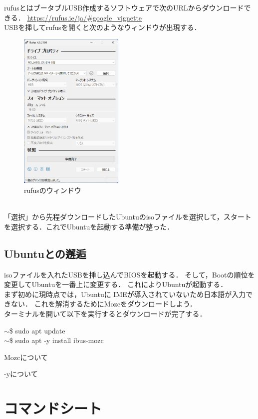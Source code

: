 \documentclass[dvipdfmx,a4paper,11pt]{jsbook}
\begin{document}
rufusとはブータブルUSB作成するソフトウェアで次のURLからダウンロードできる．
\url{https://rufus.ie/ja/#google_vignette}\\
USBを挿してrufusを開くと次のようなウィンドウが出現する．
\begin{figure}[htbp]
  \begin{center}
    \includegraphics[width = 50mm]{rufus.png}
    \caption{rufusのウィンドウ}
  \end{center}
\end{figure}
\\
「選択」から先程ダウンロードしたUbuntuのisoファイルを選択して，スタートを選択する．これでUbuntuを起動する準備が整った．

\section{Ubuntuとの邂逅}
isoファイルを入れたUSBを挿し込んでBIOSを起動する．
そして，Bootの順位を変更してUbuntuを一番上に変更する．
これによりUbuntuが起動する．\\
まず初めに現時点では，Ubuntuに
IMEが導入されていないため日本語が入力できない．
これを解消するためにMozcをダウンロードしよう．\\
ターミナルを開いて以下を実行するとダウンロードが完了する．

\begin{tcolorbox}[terminalbox]
  $\sim$\$ sudo apt update\\
  $\sim$\$ sudo apt -y install ibus-mozc
\end{tcolorbox}


\begin{subbox}{Mozcについて}

\end{subbox}


\begin{subbox}{-yについて}

\end{subbox}





\appendix
\chapter{コマンドシート}
\end{document}
